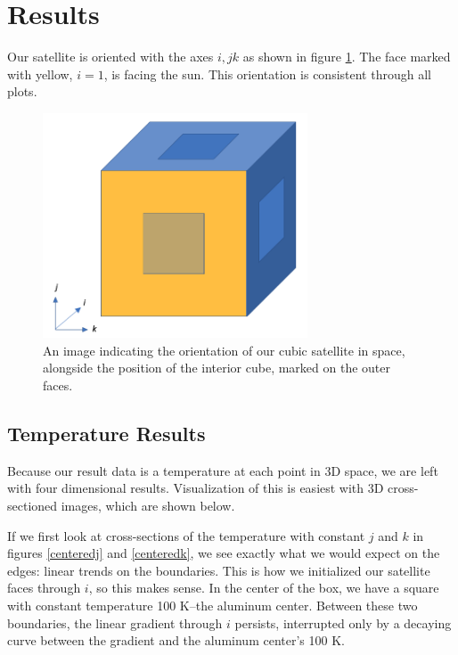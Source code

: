 \documentclass[12pt]{article}
\begin{document}
\section*{Results}

Our satellite is oriented with the axes $i, j k$ as shown in figure \ref{justbox}.  The face marked with yellow, $i = 1$, is facing the sun.  This orientation is consistent through all plots.

\begin{figure}
\begin{center}
\includegraphics[width = 0.7\textwidth]{../pics/justbox.png}
\end{center}
\caption{\label{justbox} An image indicating the orientation of our cubic satellite in space, alongside the position of the interior cube, marked on the outer faces.}
\end{figure}
\subsection*{Temperature Results}
Because our result data is a temperature at each point in 3D space, we are left with four dimensional results.  Visualization of this is easiest with 3D cross-sectioned images, which are shown below.

If we first look at cross-sections of the temperature with constant $j$ and $k$ in figures \ref{centeredj} and \ref{centeredk}, we see exactly what we would expect on the edges: linear trends on the boundaries.  This is how we initialized our satellite faces through $i$, so this makes sense.  In the center of the box, we have a square with constant temperature 100 K--the aluminum center.  Between these two boundaries, the linear gradient through $i$ persists, interrupted only by a decaying curve between the gradient and the aluminum center's 100 K.
\end{document}
